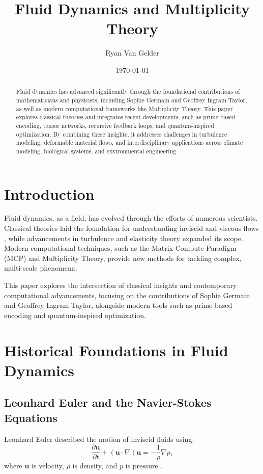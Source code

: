 \documentclass{article}
\theoremstyle{plain}
\begin{document}
\title{Fluid Dynamics and Multiplicity Theory}

\author{Ryan Van Gelder}
\date{\today}
\maketitle

\begin{abstract}
Fluid dynamics has advanced significantly through the foundational contributions of mathematicians and physicists, including Sophie Germain and Geoffrey Ingram Taylor, as well as modern computational frameworks like Multiplicity Theory. This paper explores classical theories and integrates recent developments, such as prime-based encoding, tensor networks, recursive feedback loops, and quantum-inspired optimization. By combining these insights, it addresses challenges in turbulence modeling, deformable material flows, and interdisciplinary applications across climate modeling, biological systems, and environmental engineering.
\end{abstract}

\section{Introduction}
Fluid dynamics, as a field, has evolved through the efforts of numerous scientists. Classical theories laid the foundation for understanding inviscid and viscous flows \cite{navier1827,stokes1845}, while advancements in turbulence and elasticity theory \cite{taylor1938production,dalmasso2016sophie} expanded its scope. Modern computational techniques, such as the Matrix Compute Paradigm (MCP) and Multiplicity Theory, provide new methods for tackling complex, multi-scale phenomena.

This paper explores the intersection of classical insights and contemporary computational advancements, focusing on the contributions of Sophie Germain and Geoffrey Ingram Taylor, alongside modern tools such as prime-based encoding and quantum-inspired optimization.

\section{Historical Foundations in Fluid Dynamics}
\subsection{Leonhard Euler and the Navier-Stokes Equations}
Leonhard Euler described the motion of inviscid fluids using:
\begin{equation}
\frac{\partial \mathbf{u}}{\partial t} + (\mathbf{u} \cdot \nabla) \mathbf{u} = -\frac{1}{\rho} \nabla p,
\end{equation}
where $\mathbf{u}$ is velocity, $\rho$ is density, and $p$ is pressure \cite{euler1757}.
\end{document}
